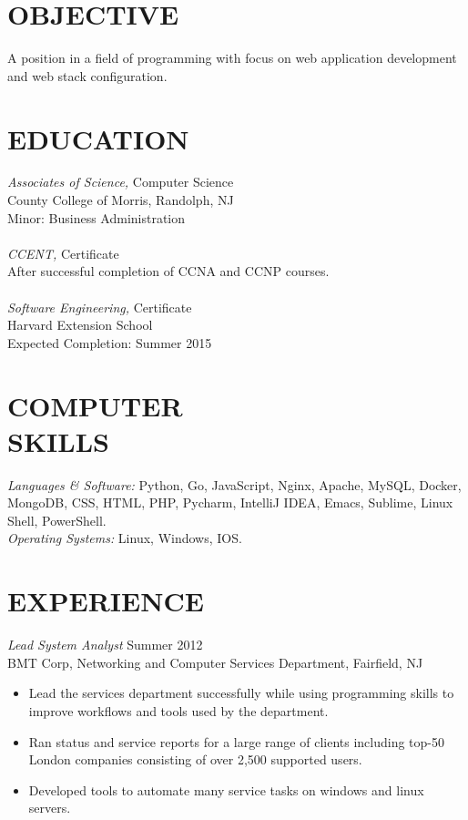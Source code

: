 \documentclass[line,margin]{res}
\begin{document}
\address{265  Main Road, Montville, NJ 07045 - 862-345-8316}
\address{github.com/odonnellryan - odonnellryanc@gmail.com}

\begin{resume}
 
\section{OBJECTIVE}	A position in a field of programming with focus 
	on web application development and web stack configuration.
 
\section{EDUCATION} {\sl Associates of Science,} Computer Science \\
		County College of Morris, Randolph, NJ  \\
	 	Minor: Business Administration \\ \\
	{\sl CCENT,} Certificate \\
		After successful completion of CCNA and CCNP courses. \\ \\
	{\sl Software Engineering,} Certificate \\
		Harvard Extension School \\
		Expected Completion: Summer 2015

\section{COMPUTER \\ SKILLS} {\sl Languages \& Software:} Python, Go, JavaScript, 
	Nginx, Apache, MySQL, Docker, MongoDB, CSS, HTML, PHP,
	Pycharm, IntelliJ IDEA, Emacs, Sublime, Linux Shell, PowerShell. \\
	{\sl Operating Systems:} Linux, Windows, IOS.

\section{EXPERIENCE} {\sl Lead System Analyst} \hfill Summer 2012 \\
	BMT Corp, Networking and Computer Services Department, Fairfield, NJ
	\begin{itemize}  \itemsep -2pt
		\item Lead the services department successfully while using programming skills to improve
			workflows and tools used by the department. 
		\item Ran status and service reports for a large range of clients including top-50
			London companies consisting of over 2,500 supported users.
		\item   Developed tools to automate many service tasks on windows and linux servers.
	\end{itemize}


\end{resume}
\end{document}
